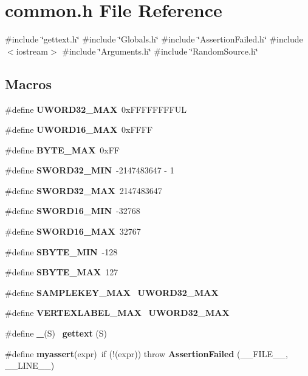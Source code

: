 \section{common.\+h File Reference}
\label{common_8h}
{\ttfamily \#include \char`\"{}gettext.\+h\char`\"{}}\newline
{\ttfamily \#include \char`\"{}Globals.\+h\char`\"{}}\newline
{\ttfamily \#include \char`\"{}Assertion\+Failed.\+h\char`\"{}}\newline
{\ttfamily \#include $<$iostream$>$}\newline
{\ttfamily \#include \char`\"{}Arguments.\+h\char`\"{}}\newline
{\ttfamily \#include \char`\"{}Random\+Source.\+h\char`\"{}}\newline
\subsection*{Macros}
\begin{DoxyCompactItemize}
\item 
\#define \textbf{ U\+W\+O\+R\+D32\+\_\+\+M\+AX}~0x\+F\+F\+F\+F\+F\+F\+F\+F\+UL
\item 
\#define \textbf{ U\+W\+O\+R\+D16\+\_\+\+M\+AX}~0x\+F\+F\+FF
\item 
\#define \textbf{ B\+Y\+T\+E\+\_\+\+M\+AX}~0x\+FF
\item 
\#define \textbf{ S\+W\+O\+R\+D32\+\_\+\+M\+IN}~-\/2147483647 -\/ 1
\item 
\#define \textbf{ S\+W\+O\+R\+D32\+\_\+\+M\+AX}~2147483647
\item 
\#define \textbf{ S\+W\+O\+R\+D16\+\_\+\+M\+IN}~-\/32768
\item 
\#define \textbf{ S\+W\+O\+R\+D16\+\_\+\+M\+AX}~32767
\item 
\#define \textbf{ S\+B\+Y\+T\+E\+\_\+\+M\+IN}~-\/128
\item 
\#define \textbf{ S\+B\+Y\+T\+E\+\_\+\+M\+AX}~127
\item 
\#define \textbf{ S\+A\+M\+P\+L\+E\+K\+E\+Y\+\_\+\+M\+AX}~\textbf{ U\+W\+O\+R\+D32\+\_\+\+M\+AX}
\item 
\#define \textbf{ V\+E\+R\+T\+E\+X\+L\+A\+B\+E\+L\+\_\+\+M\+AX}~\textbf{ U\+W\+O\+R\+D32\+\_\+\+M\+AX}
\item 
\#define \textbf{ \+\_\+}(S)~\textbf{ gettext} (S)
\item 
\#define \textbf{ myassert}(expr)~if (!(expr)) throw \textbf{ Assertion\+Failed} (\+\_\+\+\_\+\+F\+I\+L\+E\+\_\+\+\_\+, \+\_\+\+\_\+\+L\+I\+N\+E\+\_\+\+\_\+)
\end{DoxyCompactItemize}

